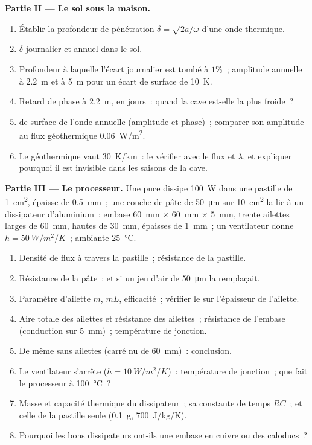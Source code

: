 \begin{problem}
\textbf{Partie II --- Le sol sous la maison.}
\begin{enumerate}[resume]
  \item Établir la profondeur de pénétration $\delta = \sqrt{2a/\omega}$ d'une
        onde thermique.
  \item $\delta$ journalier et annuel dans le sol.
  \item Profondeur à laquelle l'écart journalier est tombé à $1\%$~; amplitude
        annuelle à \qty{2.2}{m} et à \qty{5}{m} pour un écart de surface de
        \qty{10}{K}.
  \item Retard de phase à \qty{2.2}{m}, en jours~: quand la cave est-elle la plus froide~?
  \item {} de surface de l'onde annuelle (amplitude et phase)~;
        comparer son amplitude au flux géothermique \qty{0.06}{W/m^2}.
  \item Le  géothermique vaut \qty{30}{K/km}~: le vérifier avec le
        flux et $\lambda$, et expliquer pourquoi il est invisible dans les
        saisons de la cave.
\end{enumerate}

\textbf{Partie III --- Le processeur.}
Une puce dissipe \qty{100}{W} dans une pastille de \qty{1}{cm^2}, épaisse de \qty{0.5}{mm}~;
une couche de pâte de \qty{50}{\micro m} sur \qty{10}{cm^2} la lie
à un dissipateur d'aluminium~: embase \qty{60}{mm} $\times$ \qty{60}{mm} $\times$
\qty{5}{mm}, trente ailettes larges de \qty{60}{mm}, hautes de \qty{30}{mm}, épaisses de \qty{1}{mm}~;
un ventilateur donne $h = \qty{50}{W/m^2/K}$~; ambiante \qty{25}{\celsius}.
\begin{enumerate}[resume]
  \item Densité de flux à travers la pastille~; résistance de la pastille.
  \item Résistance de la pâte~; et si un jeu d'air de \qty{50}{\micro m}
        la remplaçait.
  \item Paramètre d'ailette $m$, $mL$, efficacité~; vérifier le 
        sur l'épaisseur de l'ailette.
  \item Aire totale des ailettes et résistance des ailettes~; résistance de
        l'embase (conduction sur \qty{5}{mm})~; température de jonction.
  \item De même sans ailettes (carré nu de \qty{60}{mm})~: conclusion.
  \item Le ventilateur s'arrête ($h = \qty{10}{W/m^2/K}$)~: température de jonction~;
        que fait le processeur à \qty{100}{\celsius}~?
  \item Masse et capacité thermique du dissipateur~; sa constante de temps $RC$~;
        et celle de la pastille seule (\qty{0.1}{g}, \qty{700}{J/kg/K}).
  \item Pourquoi les bons dissipateurs ont-ils une embase en cuivre ou des caloducs~?
\end{enumerate}


\end{problem}
